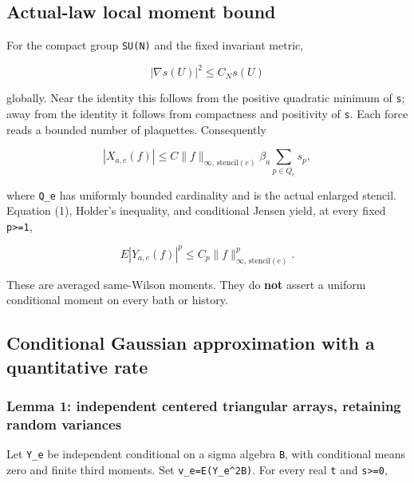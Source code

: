 \documentclass[
  11pt,
]{article}
\begin{document}
\hypertarget{actual-law-local-moment-bound}{%
\subsection{Actual-law local moment
bound}\label{actual-law-local-moment-bound}}

For the compact group \texttt{SU(N)} and the fixed invariant metric,

\[
 |\nabla s(U)|^2\le C_Ns(U)
\]

globally. Near the identity this follows from the positive quadratic
minimum of \texttt{s}; away from the identity it follows from
compactness and positivity of \texttt{s}. Each force reads a bounded
number of plaquettes. Consequently

\[
 |X_{a,e}(f)|\le C\|f\|_{\infty,\,\mathrm{stencil}(e)}
                  \beta_a\sum_{p\in Q_e}s_p,
 \tag{6}
\]

where \texttt{Q\_e} has uniformly bounded cardinality and is the actual
enlarged stencil. Equation (1), Holder's inequality, and conditional
Jensen yield, at every fixed \texttt{p\textgreater{}=1},

\[
 E|Y_{a,e}(f)|^p
 \le C_p\|f\|_{\infty,\,\mathrm{stencil}(e)}^p.
 \tag{7}
\]

These are averaged same-Wilson moments. They do \textbf{not} assert a
uniform conditional moment on every bath or history.

\hypertarget{conditional-gaussian-approximation-with-a-quantitative-rate}{%
\subsection{Conditional Gaussian approximation with a quantitative
rate}\label{conditional-gaussian-approximation-with-a-quantitative-rate}}

\hypertarget{lemma-1-independent-centered-triangular-arrays-retaining-random-variances}{%
\subsubsection{Lemma 1: independent centered triangular arrays,
retaining random
variances}\label{lemma-1-independent-centered-triangular-arrays-retaining-random-variances}}

Let \texttt{Y\_e} be independent conditional on a sigma algebra
\texttt{B}, with conditional means zero and finite third moments. Set
\texttt{v\_e=E(Y\_e\^{}2\textbar{}B)}. For every real \texttt{t} and
\texttt{s\textgreater{}=0},
\end{document}
